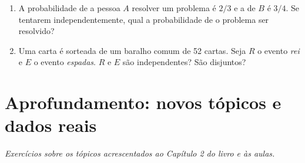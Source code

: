 \documentclass[11pt]{article}
\begin{document}
\begin{enumerate}[label=\textbf{C\arabic*.}, leftmargin=*]
\begin{enumerate}[label=(\alph*)]
  \item um preso escolhido ao acaso não sofrer de doença psiquiátrica?
  \item nenhum de três presos independentes sofrer de doença psiquiátrica?
\end{enumerate}
\item A probabilidade de a pessoa $A$ resolver um problema é $2/3$ e a de $B$ é $3/4$. Se tentarem independentemente, qual a probabilidade de o problema ser resolvido?
\item Uma carta é sorteada de um baralho comum de 52 cartas. Seja $R$ o evento \emph{rei} e $E$ o evento \emph{espadas}. $R$ e $E$ são independentes? São disjuntos?

\end{enumerate}

\bigskip
{}
\section*{Aprofundamento: novos tópicos e dados reais}
\noindent\textit{Exercícios sobre os tópicos acrescentados ao Capítulo 2 do livro e às aulas.}
\end{document}
